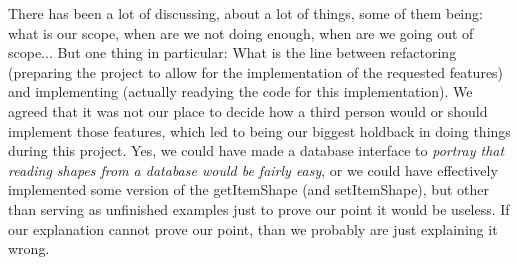 \documentclass{article}
\begin{document}
There has been a lot of discussing, about a lot of things, some of them being: what is our scope, when are we not doing enough, when are we going out of scope... But one thing in particular: What is the line between refactoring (preparing the project to allow for the implementation of the requested features) and implementing (actually readying the code for this implementation). We agreed that it was not our place to decide how a third person would or should implement those features, which led to being our biggest holdback in  doing things during this project. Yes, we could have made a database interface to \textit{portray that reading shapes from a database would be fairly easy}, or we could have effectively implemented some version of the getItemShape (and setItemShape), but other than serving as unfinished examples just to prove our point it would be useless. If our explanation cannot prove our point, than we probably are just explaining it wrong.

\newpage

\end{document}
